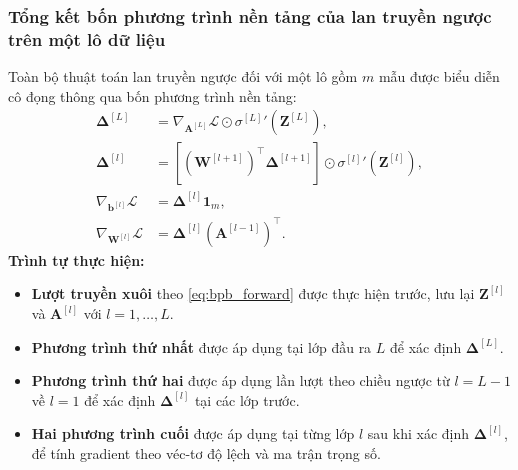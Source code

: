 \subsubsection{Tổng kết bốn phương trình nền tảng của lan truyền ngược trên một lô dữ liệu}
Toàn bộ thuật toán lan truyền ngược đối với một lô gồm $m$ mẫu được biểu diễn cô đọng thông qua bốn phương trình nền tảng:
\begin{subequations}
\label{eq:bpb_four_fundamental}
\begin{align}
    \boldsymbol{\Delta}^{[L]} &= \nabla_{\mathbf{A}^{[L]}}\mathcal{L} \odot {\sigma^{[L]}}'\!\left(\mathbf{Z}^{[L]}\right), \label{eq:bpb_output_error} \\[6pt]
    \boldsymbol{\Delta}^{[l]} &= \left[ \left(\mathbf{W}^{[l+1]}\right)^{\top}\boldsymbol{\Delta}^{[l+1]} \right] \odot {\sigma^{[l]}}'\!\left(\mathbf{Z}^{[l]}\right), \label{eq:bpb_hidden_error} \\[6pt]
    \nabla_{\mathbf{b}^{[l]}}\mathcal{L} &= \boldsymbol{\Delta}^{[l]}\mathbf{1}_m, \label{eq:bpb_bias_grad} \\[6pt]
    \nabla_{\mathbf{W}^{[l]}}\mathcal{L} &= \boldsymbol{\Delta}^{[l]}\left(\mathbf{A}^{[l-1]}\right)^{\top}. \label{eq:bpb_weight_grad}
\end{align}
\end{subequations}
\textbf{Trình tự thực hiện:}
\begin{itemize}
    \item \textbf{Lượt truyền xuôi} theo \eqref{eq:bpb_forward} được thực hiện trước, lưu lại $\mathbf{Z}^{[l]}$ và $\mathbf{A}^{[l]}$ với $l = 1,\dots,L$.
    \item \textbf{Phương trình thứ nhất} được áp dụng tại lớp đầu ra $L$ để xác định $\boldsymbol{\Delta}^{[L]}$.
    \item \textbf{Phương trình thứ hai} được áp dụng lần lượt theo chiều ngược từ $l = L-1$ về $l = 1$ để xác định $\boldsymbol{\Delta}^{[l]}$ tại các lớp trước.
    \item \textbf{Hai phương trình cuối} được áp dụng tại từng lớp $l$ sau khi xác định $\boldsymbol{\Delta}^{[l]}$, để tính gradient theo véc-tơ độ lệch và ma trận trọng số.
\end{itemize}

